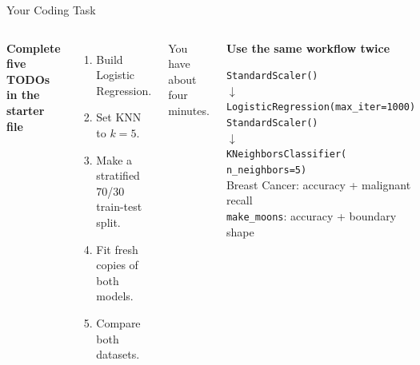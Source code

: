 \documentclass[aspectratio=169,10pt]{beamer}
\begin{document}
\begin{frame}{Your Coding Task}
  \begin{columns}[T,onlytextwidth]
    {\color{navy}\large\bfseries Complete five TODOs in the starter file}\par\vspace{0.55em}
    \begin{enumerate}
      \item Build Logistic Regression.
      \item Set KNN to $k=5$.
      \item Make a stratified 70/30 train-test split.
      \item Fit fresh copies of both models.
      \item Compare both datasets.
    \end{enumerate}
    \vspace{0.55em}
    \colorbox{warm}{\parbox{0.91\textwidth}{\centering\color{ink}\large You have about four minutes.}}

    \colorbox{mint}{\parbox[c][0.68\textheight][c]{0.84\columnwidth}{%
      \centering\color{navy}\large\bfseries Use the same workflow twice\par\vspace{1em}
      \raggedright\color{ink}\small
      \texttt{StandardScaler()}\\
      \hspace{1em}$\downarrow$\\
      \texttt{LogisticRegression(max\_iter=1000)}\\[0.7em]
      \texttt{StandardScaler()}\\
      \hspace{1em}$\downarrow$\\
      \texttt{KNeighborsClassifier(}\\
      \hspace{1em}\texttt{n\_neighbors=5)}\\[0.35em]
      \color{coral}Breast Cancer: accuracy + malignant recall\\[0.4em]
      \color{blue}\texttt{make\_moons}: accuracy + boundary shape
    }}
  \end{columns}
\end{frame}
\end{document}
